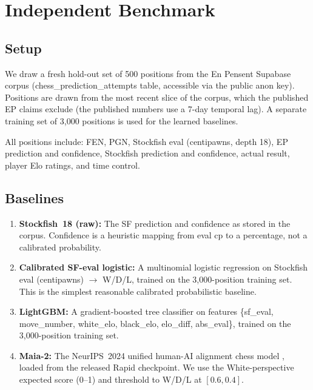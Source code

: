 \documentclass[11pt,a4paper]{article}
\begin{document}
\section{Independent Benchmark}
\label{sec:benchmark}

\subsection{Setup}

We draw a fresh hold-out set of 500 positions from the En Pensent Supabase
corpus (chess\_prediction\_attempts table, accessible via the public anon
key). Positions are drawn from the most recent slice of the corpus, which
the published EP claims exclude (the published numbers use a 7-day temporal
lag). A separate training set of 3{,}000 positions is used for the learned
baselines.

All positions include: FEN, PGN, Stockfish eval (centipawns, depth 18),
EP prediction and confidence, Stockfish prediction and confidence, actual
result, player Elo ratings, and time control.

\subsection{Baselines}

\begin{enumerate}[nosep]
  \item \textbf{Stockfish~18 (raw):} The SF prediction and confidence as
        stored in the corpus. Confidence is a heuristic mapping from eval
        cp to a percentage, not a calibrated probability.
  \item \textbf{Calibrated SF-eval logistic:} A multinomial logistic
        regression on Stockfish eval (centipawns) $\to$ W/D/L, trained on
        the 3{,}000-position training set. This is the simplest reasonable
        calibrated probabilistic baseline.
  \item \textbf{LightGBM:} A gradient-boosted tree classifier on features
        \{sf\_eval, move\_number, white\_elo, black\_elo, elo\_diff,
        abs\_eval\}, trained on the 3{,}000-position training set.
  \item \textbf{Maia-2:} The NeurIPS~2024 unified human-AI alignment chess
        model \cite{tang2024maia}, loaded from the released Rapid
        checkpoint. We use the White-perspective expected score
        (0--1) and threshold to W/D/L at $[0.6, 0.4]$.
\end{enumerate}
\end{document}
